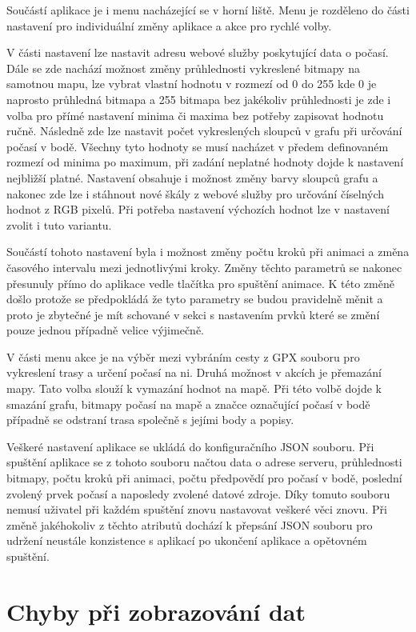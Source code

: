 \documentclass[czech,bachelor,dept460,male,csharp,cpdeclaration]{diploma}
\begin{document}
	Součástí aplikace je i menu nacházející se v horní liště. Menu je rozděleno do části nastavení pro individuální změny aplikace a akce pro rychlé volby.
	
	V části nastavení lze nastavit adresu webové služby poskytující data o počasí. Dále se zde nachází možnost změny průhlednosti vykreslené bitmapy na samotnou mapu, lze vybrat vlastní hodnotu v rozmezí od 0 do 255 kde 0 je naprosto průhledná bitmapa a 255 bitmapa bez jakékoliv průhlednosti je zde i volba pro přímé nastavení minima či maxima bez potřeby zapisovat hodnotu ručně. Následně zde lze nastavit počet vykreslených sloupců v grafu při určování počasí v bodě. Všechny tyto hodnoty se musí nacházet v předem definovaném rozmezí od minima po maximum, při zadání neplatné hodnoty dojde k nastavení nejbližší platné. Nastavení obsahuje i možnost změny barvy sloupců grafu a nakonec zde lze i stáhnout nové škály z webové služby pro určování číselných hodnot z RGB pixelů. Při potřeba nastavení výchozích hodnot lze v nastavení zvolit i tuto variantu.
	
	Součástí tohoto nastavení byla i možnost změny počtu kroků při animaci a změna časového intervalu mezi jednotlivými kroky. Změny těchto parametrů se nakonec přesunuly přímo do aplikace vedle tlačítka pro spuštění animace. K této změně došlo protože se předpokládá že tyto parametry se budou pravidelně měnit a proto je zbytečné je mít schované v sekci s nastavením prvků které se změní pouze jednou případně velice výjimečně.
	
	V části menu akce je na výběr mezi vybráním cesty z GPX souboru pro vykreslení trasy a určení počasí na ni. Druhá možnost v akcích je přemazání mapy. Tato volba slouží k vymazání hodnot na mapě. Při této volbě dojde k smazání grafu, bitmapy počasí na mapě a značce označující počasí v bodě případně se odstraní trasa společně s jejími body a popisy.
	
	Veškeré nastavení aplikace se ukládá do konfiguračního JSON souboru. Při spuštění aplikace se z tohoto souboru načtou data o adrese serveru, průhlednosti bitmapy, počtu kroků při animaci, počtu předpovědí pro počasí v bodě, poslední zvolený prvek počasí a naposledy zvolené datové zdroje. Díky tomuto souboru nemusí uživatel při každém spuštění znovu nastavovat veškeré věci znovu. Při změně jakéhokoliv z těchto atributů dochází k přepsání JSON souboru pro udržení neustále konzistence s aplikací po ukončení aplikace a opětovném spuštění.
	
	\section{Chyby při zobrazování dat}
	
\end{document}
